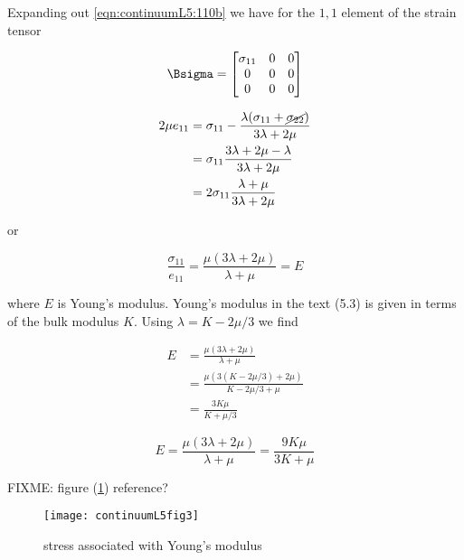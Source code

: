 Expanding out \ref{eqn:continuumL5:110b} we have for the $1,1$ element of the strain tensor


\begin{equation}\label{eqn:continuumL5:290}
\Bsigma =
\begin{bmatrix}
\sigma_{11} & 0 & 0\\
0 & 0 & 0 \\
0 & 0 & 0
\end{bmatrix}
\end{equation}

\begin{align*}
2 \mu e_{11}
&= \sigma_{11} - \frac{\lambda ( \sigma_{11} + \cancel{\sigma_{22}} ) }{3 \lambda + 2 \mu} \\
&= \sigma_{11} \frac{3 \lambda + 2 \mu - \lambda }{3 \lambda + 2 \mu} \\
&= 2 \sigma_{11} \frac{\lambda + \mu }{3 \lambda + 2 \mu}
\end{align*}

or

\begin{equation}\label{eqn:continuumL5:310}
\frac{\sigma_{11}}{e_{11}} = \frac{\mu(3 \lambda + 2 \mu)}{\lambda + \mu } = E
\end{equation}

where $E$ is Young's modulus.  Young's modulus in the text (5.3) is given in terms of the bulk modulus $K$.  Using $\lambda = K - 2\mu/3$ we find

\begin{align*}
E 
&=
\frac{\mu(3 \lambda + 2 \mu)}{\lambda + \mu } \\
&=
\frac{\mu(3 (K - 2\mu/3)+ 2 \mu)}{K - 2\mu/3 + \mu } \\
&=
\frac{3 K \mu}{ K + \mu/3 } 
\end{align*}

\begin{equation}\label{eqn:continuumL5:330}
\boxed{
E =
\frac{\mu(3 \lambda + 2 \mu)}{\lambda + \mu } =
\frac{9 K \mu}{ 3 K + \mu } 
}
\end{equation}

FIXME: figure (\ref{fig:continuumL5:continuumL5fig3}) reference?

\begin{figure}[htp]
   \centering
   \texttt{[image: continuumL5fig3]}
   \caption{stress associated with Young's modulus}\label{fig:continuumL5:continuumL5fig3}
\end{figure}

